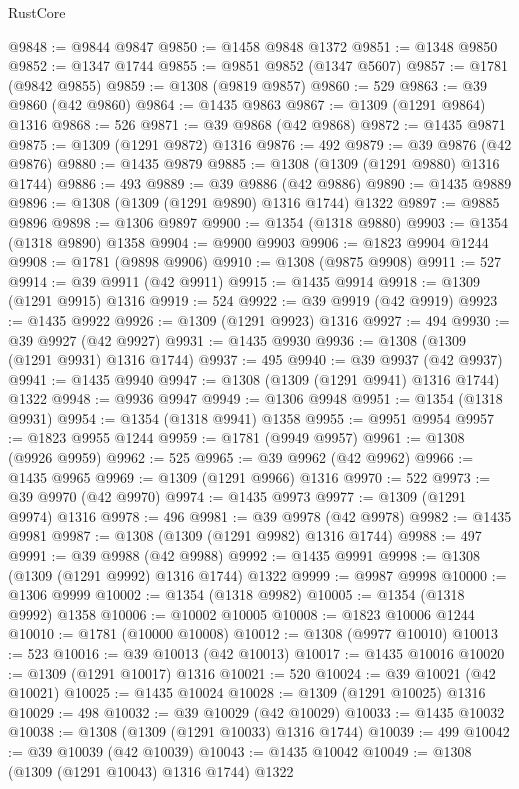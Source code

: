 \begin{lexlean}{RustCore}
\begin{coremodule}
@9848 := @9844 @9847
@9850 := @1458 @9848 @1372
@9851 := @1348 @9850
@9852 := @1347 @1744
@9855 := @9851 @9852 (@1347 @5607)
@9857 := @1781 (@9842 @9855)
@9859 := @1308 (@9819 @9857)
@9860 := 529
@9863 := @39 @9860 (@42 @9860)
@9864 := @1435 @9863
@9867 := @1309 (@1291 @9864) @1316
@9868 := 526
@9871 := @39 @9868 (@42 @9868)
@9872 := @1435 @9871
@9875 := @1309 (@1291 @9872) @1316
@9876 := 492
@9879 := @39 @9876 (@42 @9876)
@9880 := @1435 @9879
@9885 := @1308 (@1309 (@1291 @9880) @1316 @1744)
@9886 := 493
@9889 := @39 @9886 (@42 @9886)
@9890 := @1435 @9889
@9896 := @1308 (@1309 (@1291 @9890) @1316 @1744) @1322
@9897 := @9885 @9896
@9898 := @1306 @9897
@9900 := @1354 (@1318 @9880)
@9903 := @1354 (@1318 @9890) @1358
@9904 := @9900 @9903
@9906 := @1823 @9904 @1244
@9908 := @1781 (@9898 @9906)
@9910 := @1308 (@9875 @9908)
@9911 := 527
@9914 := @39 @9911 (@42 @9911)
@9915 := @1435 @9914
@9918 := @1309 (@1291 @9915) @1316
@9919 := 524
@9922 := @39 @9919 (@42 @9919)
@9923 := @1435 @9922
@9926 := @1309 (@1291 @9923) @1316
@9927 := 494
@9930 := @39 @9927 (@42 @9927)
@9931 := @1435 @9930
@9936 := @1308 (@1309 (@1291 @9931) @1316 @1744)
@9937 := 495
@9940 := @39 @9937 (@42 @9937)
@9941 := @1435 @9940
@9947 := @1308 (@1309 (@1291 @9941) @1316 @1744) @1322
@9948 := @9936 @9947
@9949 := @1306 @9948
@9951 := @1354 (@1318 @9931)
@9954 := @1354 (@1318 @9941) @1358
@9955 := @9951 @9954
@9957 := @1823 @9955 @1244
@9959 := @1781 (@9949 @9957)
@9961 := @1308 (@9926 @9959)
@9962 := 525
@9965 := @39 @9962 (@42 @9962)
@9966 := @1435 @9965
@9969 := @1309 (@1291 @9966) @1316
@9970 := 522
@9973 := @39 @9970 (@42 @9970)
@9974 := @1435 @9973
@9977 := @1309 (@1291 @9974) @1316
@9978 := 496
@9981 := @39 @9978 (@42 @9978)
@9982 := @1435 @9981
@9987 := @1308 (@1309 (@1291 @9982) @1316 @1744)
@9988 := 497
@9991 := @39 @9988 (@42 @9988)
@9992 := @1435 @9991
@9998 := @1308 (@1309 (@1291 @9992) @1316 @1744) @1322
@9999 := @9987 @9998
@10000 := @1306 @9999
@10002 := @1354 (@1318 @9982)
@10005 := @1354 (@1318 @9992) @1358
@10006 := @10002 @10005
@10008 := @1823 @10006 @1244
@10010 := @1781 (@10000 @10008)
@10012 := @1308 (@9977 @10010)
@10013 := 523
@10016 := @39 @10013 (@42 @10013)
@10017 := @1435 @10016
@10020 := @1309 (@1291 @10017) @1316
@10021 := 520
@10024 := @39 @10021 (@42 @10021)
@10025 := @1435 @10024
@10028 := @1309 (@1291 @10025) @1316
@10029 := 498
@10032 := @39 @10029 (@42 @10029)
@10033 := @1435 @10032
@10038 := @1308 (@1309 (@1291 @10033) @1316 @1744)
@10039 := 499
@10042 := @39 @10039 (@42 @10039)
@10043 := @1435 @10042
@10049 := @1308 (@1309 (@1291 @10043) @1316 @1744) @1322

\end{coremodule}
\end{lexlean}
